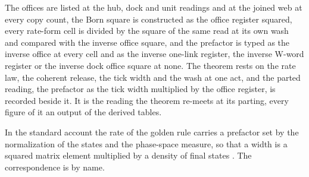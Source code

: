 The offices are listed at the hub, dock and unit readings and at the joined web at every copy count, the Born square is constructed as the office register squared, every rate-form cell is divided by the square of the same read at its own wash and compared with the inverse office square, and the prefactor is typed as the inverse office at every cell and as the inverse one-link register, the inverse W-word register or the inverse dock office square at none. The theorem rests on the rate law, the coherent release, the tick width and the wash at one act, and the parted reading, the prefactor as the tick width multiplied by the office register, is recorded beside it. It is the reading the theorem re-meets at its parting, every figure of it an output of the derived tables.
\begin{chbridge}
In the standard account the rate of the golden rule carries a prefactor set by the normalization of the states and the phase-space measure, so that a width is a squared matrix element multiplied by a density of final states \cite{Dirac1927,Fermi1934}. The correspondence is by name.
\end{chbridge}
